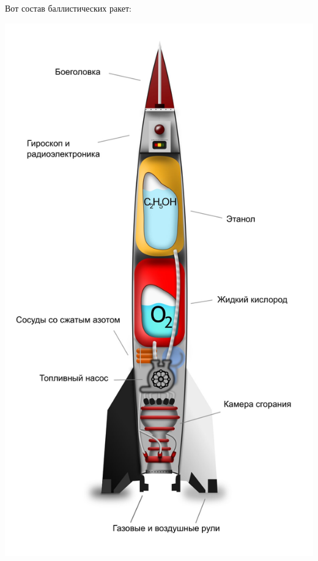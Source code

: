 \documentclass[a4paper, 12pt]{report}
\begin{document}
\clearpage
\textrm{Вот состав баллистических ракет: }
\begin{flushright}
    \includegraphics[scale=0.25]{пример_баллистической_ракеты}
    \label{Рис. 2. Состав баллистической ракеты}
\end{flushright}
\end{document}
